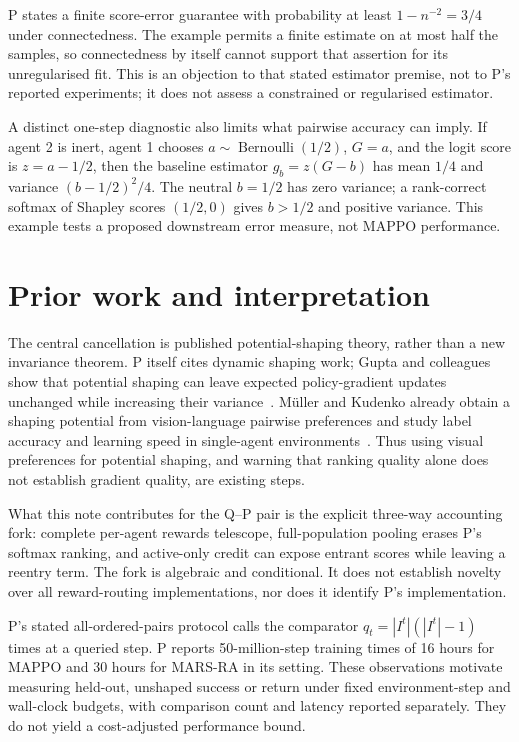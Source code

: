 \documentclass{article}
\begin{document}
P states a finite score-error guarantee with probability at least \(1-n^{-2}=3/4\) under connectedness. The
example permits a finite estimate on at most half the samples, so connectedness by itself cannot support that
assertion for its unregularised fit. This is an objection to that stated estimator premise, not to P's
reported experiments; it does not assess a constrained or regularised estimator. %

A distinct one-step diagnostic also limits what pairwise accuracy can imply. If agent 2 is inert, agent 1
chooses \(a\sim\operatorname{Bernoulli}(1/2)\), \(G=a\), and the logit score is \(z=a-1/2\), then the
baseline estimator \(g_b=z(G-b)\) has mean \(1/4\) and variance \((b-1/2)^2/4\). The neutral \(b=1/2\) has
zero variance; a rank-correct softmax of Shapley scores \((1/2,0)\) gives \(b>1/2\) and positive variance.
This example tests a proposed downstream error measure, not MAPPO performance. %

\section{Prior work and interpretation}

The central cancellation is published potential-shaping theory, rather than a new invariance theorem. P
itself cites dynamic shaping work; Gupta and colleagues show that potential shaping can leave expected
policy-gradient updates unchanged while increasing their variance~\cite{gupta2023}. Müller and Kudenko
already obtain a shaping potential from vision-language pairwise preferences and study label accuracy and
learning speed in single-agent environments~\cite{muller2026}. Thus using visual preferences for potential
shaping, and warning that ranking quality alone does not establish gradient quality, are existing steps.

What this note contributes for the Q--P pair is the explicit three-way accounting fork: complete per-agent
rewards telescope, full-population pooling erases P's softmax ranking, and active-only credit can expose
entrant scores while leaving a reentry term. The fork is algebraic and conditional. It does not establish
novelty over all reward-routing implementations, nor does it identify P's implementation.

P's stated all-ordered-pairs protocol calls the comparator \(q_t=|I^t|(|I^t|-1)\) times at a queried step. P
reports 50-million-step training times of 16 hours for MAPPO and 30 hours for MARS-RA in its setting. These
observations motivate measuring held-out, unshaped success or return under fixed environment-step and
wall-clock budgets, with comparison count and latency reported separately. They do not yield a cost-adjusted
performance bound. %
\end{document}
